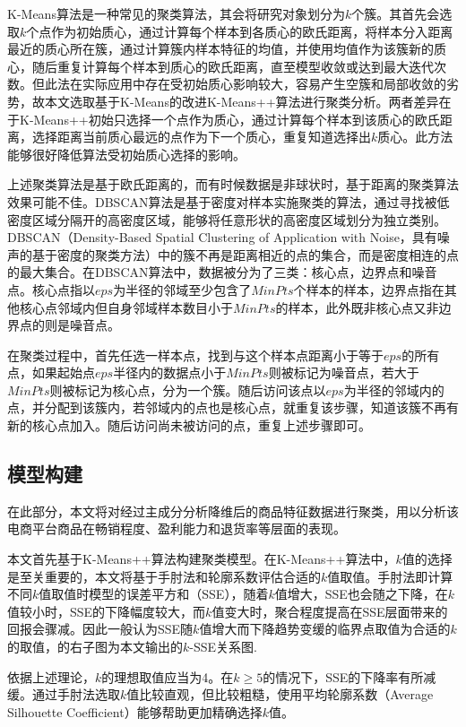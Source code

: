 \documentclass[lang=cn,11pt,a4paper,cite=authoryear]{elegantpaper}
\begin{document}
K-Means算法是一种常见的聚类算法，其会将研究对象划分为$k$个簇。其首先会选取$k$个点作为初始质心，通过计算每个样本到各质心的欧氏距离，将样本分入距离最近的质心所在簇，通过计算簇内样本特征的均值，并使用均值作为该簇新的质心，随后重复计算每个样本到质心的欧氏距离，直至模型收敛或达到最大迭代次数。但此法在实际应用中存在受初始质心影响较大，容易产生空簇和局部收敛的劣势，故本文选取基于K-Means的改进K-Means++算法进行聚类分析。两者差异在于K-Means++初始只选择一个点作为质心，通过计算每个样本到该质心的欧氏距离，选择距离当前质心最远的点作为下一个质心，重复知道选择出$k$质心。此方法能够很好降低算法受初始质心选择的影响。

上述聚类算法是基于欧氏距离的，而有时候数据是非球状时，基于距离的聚类算法效果可能不佳。DBSCAN算法是基于密度对样本实施聚类的算法，通过寻找被低密度区域分隔开的高密度区域，能够将任意形状的高密度区域划分为独立类别。DBSCAN（Density-Based Spatial Clustering of Application with Noise，具有噪声的基于密度的聚类方法）中的簇不再是距离相近的点的集合，而是密度相连的点的最大集合。在DBSCAN算法中，数据被分为了三类：核心点，边界点和噪音点。核心点指以$eps$为半径的邻域至少包含了$MinPts$个样本的样本，边界点指在其他核心点邻域内但自身邻域样本数目小于$MinPts$的样本，此外既非核心点又非边界点的则是噪音点。

在聚类过程中，首先任选一样本点，找到与这个样本点距离小于等于$eps$的所有点，如果起始点$eps$半径内的数据点小于$MinPts$则被标记为噪音点，若大于$MinPts$则被标记为核心点，分为一个簇。随后访问该点以$eps$为半径的邻域内的点，并分配到该簇内，若邻域内的点也是核心点，就重复该步骤，知道该簇不再有新的核心点加入。随后访问尚未被访问的点，重复上述步骤即可。

\subsection{模型构建}

在此部分，本文将对经过主成分分析降维后的商品特征数据进行聚类，用以分析该电商平台商品在畅销程度、盈利能力和退货率等层面的表现。

本文首先基于K-Means++算法构建聚类模型。在K-Means++算法中，$k$值的选择是至关重要的，本文将基于手肘法和轮廓系数评估合适的$k$值取值。手肘法即计算不同$k$值取值时模型的误差平方和（SSE），随着$k$值增大，SSE也会随之下降，在$k$值较小时，SSE的下降幅度较大，而$k$值变大时，聚合程度提高在SSE层面带来的回报会骤减。因此一般认为SSE随$k$值增大而下降趋势变缓的临界点取值为合适的$k$的取值，的右子图为本文输出的$k$-SSE关系图.

依据上述理论，$k$的理想取值应当为4。在$k \geqslant 5$的情况下，SSE的下降率有所减缓。通过手肘法选取$k$值比较直观，但比较粗糙，使用平均轮廓系数（Average Silhouette Coefficient）能够帮助更加精确选择$k$值。
\end{document}
